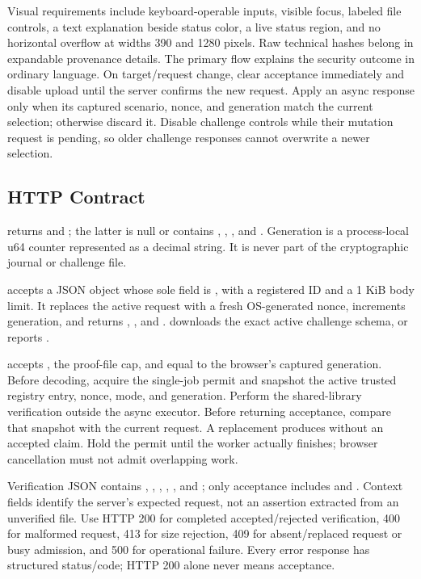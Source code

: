 \documentclass[11pt]{article}
\begin{document}
Visual requirements include keyboard-operable inputs, visible focus, labeled file controls, a text explanation beside status color, a live status region, and no horizontal overflow at widths 390 and 1280 pixels. Raw technical hashes belong in expandable provenance details. The primary flow explains the security outcome in ordinary language. On target/request change, clear acceptance immediately and disable upload until the server confirms the new request. Apply an async response only when its captured scenario, nonce, and generation match the current selection; otherwise discard it. Disable challenge controls while their mutation request is pending, so older challenge responses cannot overwrite a newer selection.

\subsection{HTTP Contract}
 returns  and ; the latter is null or contains , , , and . Generation is a process-local u64 counter represented as a decimal string. It is never part of the cryptographic journal or challenge file.

 accepts a JSON object whose sole field is , with a registered ID and a 1 KiB body limit. It replaces the active request with a fresh OS-generated nonce, increments generation, and returns , , and .  downloads the exact active challenge schema, or reports .

 accepts , the proof-file cap, and  equal to the browser's captured generation. Before decoding, acquire the single-job permit and snapshot the active trusted registry entry, nonce, mode, and generation. Perform the shared-library verification outside the async executor. Before returning acceptance, compare that snapshot with the current request. A replacement produces  without an accepted claim. Hold the permit until the worker actually finishes; browser cancellation must not admit overlapping work.

Verification JSON contains , , , , , and ; only acceptance includes  and . Context fields identify the server's expected request, not an assertion extracted from an unverified file. Use HTTP 200 for completed accepted/rejected verification, 400 for malformed request, 413 for size rejection, 409 for absent/replaced request or busy admission, and 500 for operational failure. Every error response has structured status/code; HTTP 200 alone never means acceptance.
\end{document}
